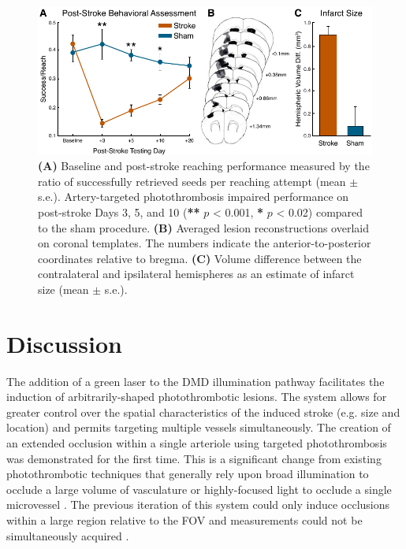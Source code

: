 \begin{figure}
    \includegraphics{figures/chapter_3/functionalimpairment.pdf}
    \caption{
        \label{fig:functionalimpairment}
        \textbf{(A)} Baseline and post-stroke reaching performance measured by the ratio of successfully retrieved seeds per reaching attempt (mean $\pm$ s.e.). Artery-targeted photothrombosis impaired performance on post-stroke Days 3, 5, and 10 (\textbf{**} $p$ \textless{} 0.001, \textbf{*} $p$ \textless{} 0.02) compared to the sham procedure. \textbf{(B)} Averaged lesion reconstructions overlaid on coronal templates. The numbers indicate the anterior-to-posterior coordinates relative to bregma. \textbf{(C)} Volume difference between the contralateral and ipsilateral hemispheres as an estimate of infarct size (mean $\pm$ s.e.).
    }
\end{figure}



\section{Discussion}

The addition of a green laser to the DMD illumination pathway facilitates the induction of arbitrarily-shaped photothrombotic lesions. The system allows for greater control over the spatial characteristics of the induced stroke (e.g. size and location) and permits targeting multiple vessels simultaneously. The creation of an extended occlusion within a single arteriole using targeted photothrombosis was demonstrated for the first time. This is a significant change from existing photothrombotic techniques that generally rely upon broad illumination to occlude a large volume of vasculature \cite{Watson:1985bp, Schrandt:2015gu} or highly-focused light to occlude a single microvessel \cite{Schaffer:2006fb}. The previous iteration of this system could only induce occlusions within a large region relative to the FOV and  measurements could not be simultaneously acquired \cite{Ponticorvo:2010uv}.

